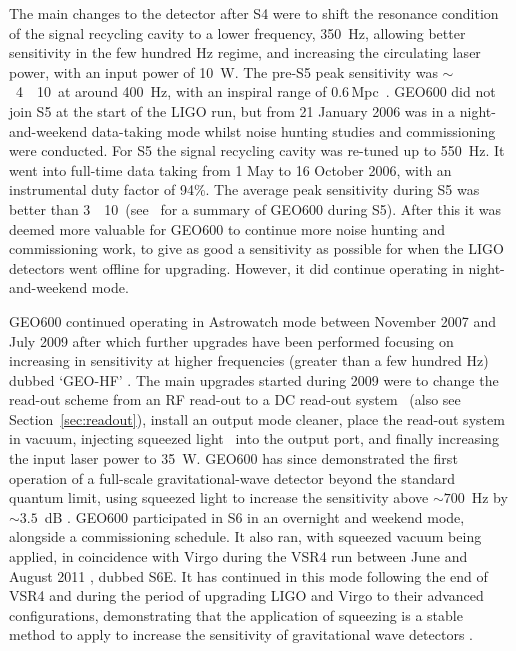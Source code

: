 The main changes to the detector after S4 were to shift the resonance condition of the signal recycling 
cavity to a lower frequency, 350~Hz, allowing better sensitivity in the few hundred Hz regime, and increasing 
the circulating laser power, with an input power of 10~W. The pre-S5 peak sensitivity was
$\sim$~4~\texttimes~10~\Hz at around 400~Hz, with an inspiral range of 0.6\,Mpc~\cite{Hild:2006b}. 
GEO600 did not join S5 at the start of the LIGO run, but from 21 January 2006 was in a night-and-weekend 
data-taking mode whilst noise hunting studies and commissioning were conducted. For S5 the signal recycling 
cavity was re-tuned up to 550~Hz. It went into full-time data taking from 1 May to 16 October 2006, with an 
instrumental duty factor of 94\%. The average peak sensitivity during S5 was better than
3~\texttimes~10~\Hz (see~\cite{Willke:2007} for a summary of GEO600 during S5). After this it was 
deemed more valuable for GEO600 to continue more noise hunting and commissioning work, to give as good a 
sensitivity as possible for when the LIGO detectors went offline for upgrading. However, it did continue 
operating in night-and-weekend mode.

GEO600 continued operating in Astrowatch mode between November 2007 and July 2009 after which further 
upgrades have been performed focusing on increasing in sensitivity at higher frequencies (greater than a
few hundred Hz) dubbed `GEO-HF' \cite{Willke:2006, Grote:2010}.  The main upgrades started during 2009 were 
to change the read-out scheme from an RF read-out to a DC read-out system~\cite{Hild:2009} (also see 
Section~\ref{sec:readout}), install an output mode cleaner, place the read-out system in vacuum, injecting 
squeezed light~\cite{Vahlbruch:2008, Chelkowski:2007} into the output port, and finally increasing the input 
laser power to 35~W. GEO600 has since demonstrated the first operation of a full-scale gravitational-wave 
detector beyond the standard quantum limit, using squeezed light to increase the sensitivity above $\sim 
700$~Hz by $\sim 3.5$~dB \cite{2011NatPh...7..962L}. GEO600 participated in S6 in an overnight and weekend 
mode, alongside a commissioning schedule. It also ran, with squeezed vacuum being applied, in coincidence 
with Virgo during the VSR4 run between June and August 2011 \cite{2013PhRvL.110r1101G}, dubbed S6E. It has continued in 
this mode following the end of VSR4 and during the period of upgrading LIGO and Virgo to their advanced 
configurations, demonstrating that the application of squeezing is a stable method to apply to increase the 
sensitivity of gravitational wave detectors \cite{2013PhRvL.110r1101G}.

